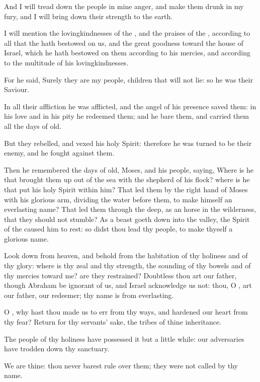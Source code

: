 \verse And I will tread down the people in mine anger, and make them drunk in my fury, and I will bring down their strength to the earth.

\verse I will mention the lovingkindnesses of the \LORD, and the praises of the \LORD, according to all that the \LORD hath bestowed on us, and the great goodness toward the house of Israel, which he hath bestowed on them according to his mercies, and according to the multitude of his lovingkindnesses.

\verse For he said, Surely they are my people, children that will not lie: so he was their Saviour.

\verse In all their affliction he was afflicted, and the angel of his presence saved them: in his love and in his pity he redeemed them; and he bare them, and carried them all the days of old.

\verse But they rebelled, and vexed his holy Spirit: therefore he was turned to be their enemy, and he fought against them.

\verse Then he remembered the days of old, Moses, and his people, saying, Where is he that brought them up out of the sea with the shepherd of his flock? where is he that put his holy Spirit within him?  \verse That led them by the right hand of Moses with his glorious arm, dividing the water before them, to make himself an everlasting name?  \verse That led them through the deep, as an horse in the wilderness, that they should not stumble?  \verse As a beast goeth down into the valley, the Spirit of the \LORD caused him to rest: so didst thou lead thy people, to make thyself a glorious name.

\verse Look down from heaven, and behold from the habitation of thy holiness and of thy glory: where is thy zeal and thy strength, the sounding of thy bowels and of thy mercies toward me? are they restrained?  \verse Doubtless thou art our father, though Abraham be ignorant of us, and Israel acknowledge us not: thou, O \LORD, art our father, our redeemer; thy name is from everlasting.

\verse O \LORD, why hast thou made us to err from thy ways, and hardened our heart from thy fear? Return for thy servants' sake, the tribes of thine inheritance.

\verse The people of thy holiness have possessed it but a little while: our adversaries have trodden down thy sanctuary.

\verse We are thine: thou never barest rule over them; they were not called by thy name.


